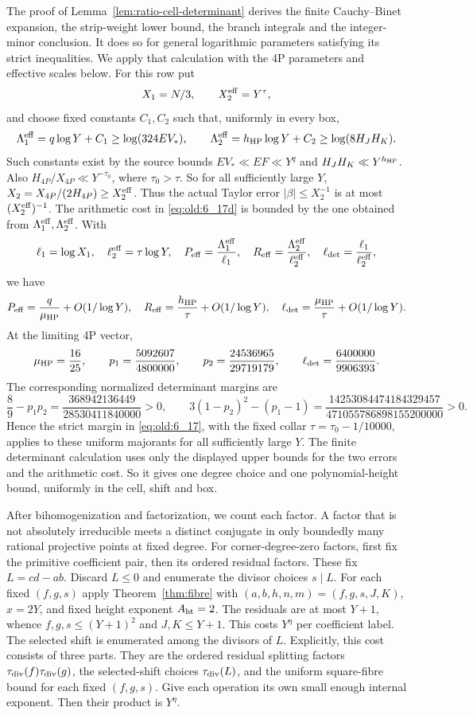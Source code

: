 The proof of Lemma~\ref{lem:ratio-cell-determinant} derives the finite
Cauchy--Binet expansion, the strip-weight lower bound, the branch
integrals and the integer-minor conclusion.  It does so for general
logarithmic parameters satisfying its strict inequalities.  We apply that
calculation with the 4P parameters and effective scales below.
For this row put
\[
 X_1=N/3,\qquad X_2^{\rm eff}=Y^\tau,
\]
and choose fixed constants \(C_1,C_2\) such that, uniformly in every
box,
\[
 \Lambda_1^{\rm eff}=q\log Y+C_1\ge\log(324EV_*),\qquad
 \Lambda_2^{\rm eff}=h_{\rm HP}\log Y+C_2\ge\log(8H_JH_K).
\]
Such constants exist by the source bounds \(EV_*\ll EF\ll Y^q\) and
\(H_JH_K\ll Y^{h_{\rm HP}}\).  Also \(H_{4P}/X_{4P}\ll Y^{-\tau_0}\), where
\(\tau_0>\tau\).  So for all sufficiently large \(Y\),
\(X_2=X_{4P}/(2H_{4P})\ge X_2^{\rm eff}\).  Thus the actual Taylor error
\(|\beta|\le X_2^{-1}\) is at most \((X_2^{\rm eff})^{-1}\).  The
arithmetic cost in \eqref{eq:old:6_17d} is bounded by the one obtained from
\(\Lambda_1^{\rm eff},\Lambda_2^{\rm eff}\).  With
\[
 \ell_1=\log X_1,\quad \ell_2^{\rm eff}=\tau\log Y,\quad
 P_{\rm eff}=\frac{\Lambda_1^{\rm eff}}{\ell_1},\quad
 R_{\rm eff}=\frac{\Lambda_2^{\rm eff}}{\ell_2^{\rm eff}},\quad
 \ell_{\rm det}=\frac{\ell_1}{\ell_2^{\rm eff}},
\]
we have
\[
 P_{\rm eff}=\frac q{\mu_{\rm HP}}+O(1/\log Y),\quad
 R_{\rm eff}=\frac{h_{\rm HP}}\tau+O(1/\log Y),\quad
 \ell_{\rm det}=\frac{\mu_{\rm HP}}\tau+O(1/\log Y).
\]
At the limiting 4P vector,
\[
 \mu_{\rm HP}=\frac{16}{25},\qquad
 p_1=\frac{5092607}{4800000},\qquad
 p_2=\frac{24536965}{29719179},\qquad
 \ell_{\rm det}=\frac{6400000}{9906393}.
\]
The corresponding normalized determinant margins are
\[
 \frac89-p_1p_2=\frac{368942136449}{28530411840000}>0,\qquad
 3(1-p_2)^2-(p_1-1)
 =\frac{14253084474184329457}{471055786898155200000}>0.
\]
Hence the strict margin in \eqref{eq:old:6_17}, with the fixed collar
\(\tau=\tau_0-1/10000\), applies to these uniform majorants
for all sufficiently large \(Y\).  The finite determinant calculation uses
only the displayed upper bounds for the two errors and the arithmetic
cost.  So it gives one degree choice and one polynomial-height bound,
uniformly in the cell, shift and box.

After bihomogenization and factorization, we count each factor.
A factor that is not absolutely irreducible meets a distinct conjugate
in only boundedly many rational projective points at fixed degree.  For
corner-degree-zero factors, first fix the primitive coefficient pair,
then its ordered residual factors.  These fix $L=cd-ab$.  Discard $L\le0$
and enumerate the divisor choices $s\mid L$.  For each fixed
$(f,g,s)$ apply Theorem~\ref{thm:fibre} with
$(a,b,h,n,m)=(f,g,s,J,K)$, $x=2Y$, and fixed height exponent
$A_{\rm ht}=2$.
The residuals are at most $Y+1$, whence $f,g,s\le(Y+1)^2$ and
$J,K\le Y+1$.  This costs $Y^\eta$ per coefficient label.  The selected
shift is enumerated among the divisors of \(L\).  Explicitly, this cost
consists of three parts.  They are the ordered residual splitting factors
\(\tau_{\mathrm{div}}(f)\tau_{\mathrm{div}}(g)\), the selected-shift choices \(\tau_{\mathrm{div}}(L)\), and
the uniform square-fibre bound for each fixed \((f,g,s)\).  Give each
operation its own small enough internal exponent.  Then their product is
\(Y^\eta\).

